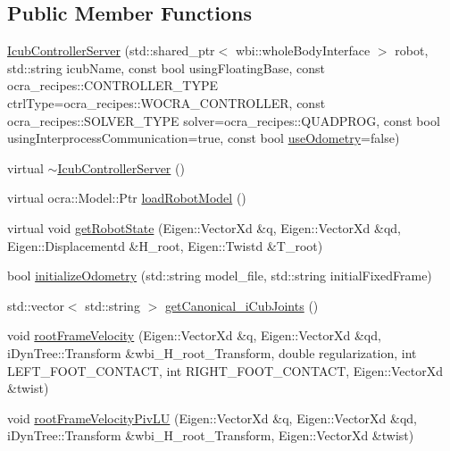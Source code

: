 \subsection*{Public Member Functions}
\begin{DoxyCompactItemize}
\item 
\hyperlink{classIcubControllerServer_a6b0a6021e3c82e72ac97ad30d3f0c082}{Icub\+Controller\+Server} (std\+::shared\+\_\+ptr$<$ wbi\+::whole\+Body\+Interface $>$ robot, std\+::string icub\+Name, const bool using\+Floating\+Base, const ocra\+\_\+recipes\+::\+C\+O\+N\+T\+R\+O\+L\+L\+E\+R\+\_\+\+T\+Y\+PE ctrl\+Type=ocra\+\_\+recipes\+::\+W\+O\+C\+R\+A\+\_\+\+C\+O\+N\+T\+R\+O\+L\+L\+ER, const ocra\+\_\+recipes\+::\+S\+O\+L\+V\+E\+R\+\_\+\+T\+Y\+PE solver=ocra\+\_\+recipes\+::\+Q\+U\+A\+D\+P\+R\+OG, const bool using\+Interprocess\+Communication=true, const bool \hyperlink{classIcubControllerServer_adc410f503b14ed288c01e877ac405114}{use\+Odometry}=false)
\item 
virtual \hyperlink{classIcubControllerServer_a7582d4bbf9851ee9b58913ea2a89e5fd}{$\sim$\+Icub\+Controller\+Server} ()
\item 
virtual ocra\+::\+Model\+::\+Ptr \hyperlink{classIcubControllerServer_a025d8e257a69ef3d2c5a10b3cbfe2350}{load\+Robot\+Model} ()
\item 
virtual void \hyperlink{classIcubControllerServer_ac068c7930f342bb0cb0969d0d04267cf}{get\+Robot\+State} (Eigen\+::\+Vector\+Xd \&q, Eigen\+::\+Vector\+Xd \&qd, Eigen\+::\+Displacementd \&H\+\_\+root, Eigen\+::\+Twistd \&T\+\_\+root)
\item 
bool \hyperlink{classIcubControllerServer_a810f139a27e06458549ccbb3fde12359}{initialize\+Odometry} (std\+::string model\+\_\+file, std\+::string initial\+Fixed\+Frame)
\item 
std\+::vector$<$ std\+::string $>$ \hyperlink{classIcubControllerServer_a892bb43e568d3f112465dff1e0c6b348}{get\+Canonical\+\_\+i\+Cub\+Joints} ()
\item 
void \hyperlink{classIcubControllerServer_a032c035880f8ec2b77ef14521be6e75a}{root\+Frame\+Velocity} (Eigen\+::\+Vector\+Xd \&q, Eigen\+::\+Vector\+Xd \&qd, i\+Dyn\+Tree\+::\+Transform \&wbi\+\_\+\+H\+\_\+root\+\_\+\+Transform, double regularization, int L\+E\+F\+T\+\_\+\+F\+O\+O\+T\+\_\+\+C\+O\+N\+T\+A\+CT, int R\+I\+G\+H\+T\+\_\+\+F\+O\+O\+T\+\_\+\+C\+O\+N\+T\+A\+CT, Eigen\+::\+Vector\+Xd \&twist)
\item 
void \hyperlink{classIcubControllerServer_a27211ecba9fc8618733bcaea9ff7d140}{root\+Frame\+Velocity\+Piv\+LU} (Eigen\+::\+Vector\+Xd \&q, Eigen\+::\+Vector\+Xd \&qd, i\+Dyn\+Tree\+::\+Transform \&wbi\+\_\+\+H\+\_\+root\+\_\+\+Transform, Eigen\+::\+Vector\+Xd \&twist)

\end{DoxyCompactItemize}
